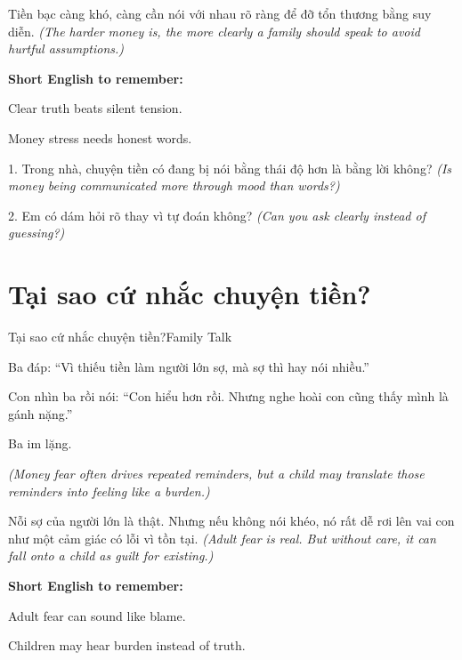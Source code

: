 \begin{baihoc}
Tiền bạc càng khó, càng cần nói với nhau rõ ràng để đỡ tổn thương bằng suy diễn.
\textit{(The harder money is, the more clearly a family should speak to avoid hurtful assumptions.)}
\end{baihoc}

\begin{ghinhoanh}
\textbf{Short English to remember:}

Clear truth beats silent tension.

Money stress needs honest words.
\end{ghinhoanh}

\begin{tuhocnhanh}
1. Trong nhà, chuyện tiền có đang bị nói bằng thái độ hơn là bằng lời không? \textit{(Is money being communicated more through mood than words?)}

2. Em có dám hỏi rõ thay vì tự đoán không? \textit{(Can you ask clearly instead of guessing?)}
\end{tuhocnhanh}
\ngancach

\section{Tại sao cứ nhắc chuyện tiền?}
\begin{truyen}{Tại sao cứ nhắc chuyện tiền?}{Family Talk}

Ba đáp: ``Vì thiếu tiền làm người lớn sợ, mà sợ thì hay nói nhiều.''

Con nhìn ba rồi nói: ``Con hiểu hơn rồi. Nhưng nghe hoài con cũng thấy mình là gánh nặng.''

Ba im lặng.

\textit{(Money fear often drives repeated reminders, but a child may translate those reminders into feeling like a burden.)}
\end{truyen}

\begin{baihoc}
Nỗi sợ của người lớn là thật. Nhưng nếu không nói khéo, nó rất dễ rơi lên vai con như một cảm giác có lỗi vì tồn tại.
\textit{(Adult fear is real. But without care, it can fall onto a child as guilt for existing.)}
\end{baihoc}

\begin{ghinhoanh}
\textbf{Short English to remember:}

Adult fear can sound like blame.

Children may hear burden instead of truth.
\end{ghinhoanh}

